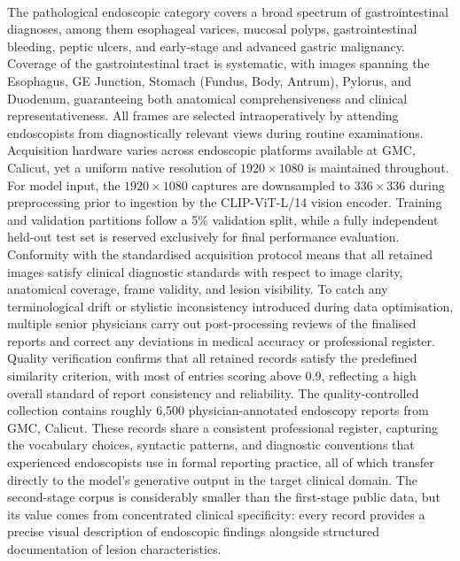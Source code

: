 ﻿﻿\documentclass[12pt]{report}
\begin{document}
 The pathological endoscopic category covers a broad spectrum of gastrointestinal diagnoses, among them esophageal varices, mucosal polyps, gastrointestinal bleeding, peptic ulcers, and early-stage and advanced gastric malignancy. Coverage of the gastrointestinal tract is systematic, with images spanning the Esophagus, GE Junction, Stomach (Fundus, Body, Antrum), Pylorus, and Duodenum, guaranteeing both anatomical comprehensiveness and clinical representativeness. All frames are selected intraoperatively by attending endoscopists from diagnostically relevant views during routine examinations. Acquisition hardware varies across endoscopic platforms available at GMC, Calicut, yet a uniform native resolution of $1920 \times 1080$ is maintained throughout. For model input, the $1920\times1080$ captures are downsampled to $336\times336$ during preprocessing prior to ingestion by the CLIP-ViT-L/14 vision encoder. Training and validation partitions follow a 5\% validation split, while a fully independent held-out test set is reserved exclusively for final performance evaluation. Conformity with the standardised acquisition protocol means that all retained images satisfy clinical diagnostic standards with respect to image clarity, anatomical coverage, frame validity, and lesion visibility. To catch any terminological drift or stylistic inconsistency introduced during data optimisation, multiple senior physicians carry out post-processing reviews of the finalised reports and correct any deviations in medical accuracy or professional register.
Quality verification confirms that all retained records satisfy the predefined similarity criterion, with most of entries scoring above 0.9, reflecting a high overall standard of report consistency and reliability. The quality-controlled collection contains roughly 6,500 physician-annotated endoscopy reports from GMC, Calicut. These records share a consistent professional register, capturing the vocabulary choices, syntactic patterns, and diagnostic conventions that experienced endoscopists use in formal reporting practice, all of which transfer directly to the model's generative output in the target clinical domain. The second-stage corpus is considerably smaller than the first-stage public data, but its value comes from concentrated clinical specificity: every record provides a precise visual description of endoscopic findings alongside structured documentation of lesion characteristics.
\end{document}
